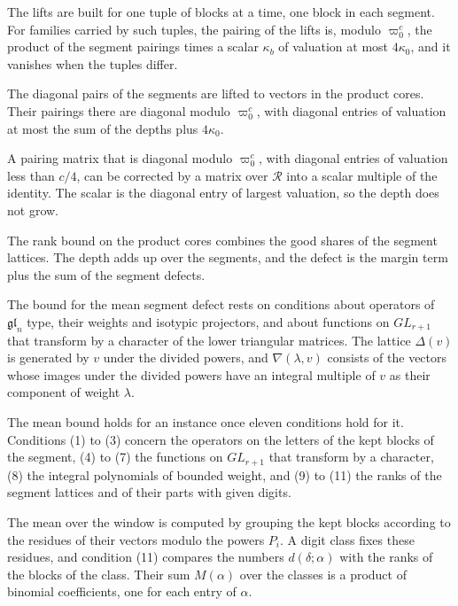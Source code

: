 The lifts are built for one tuple of blocks at a time, one block in each segment. For families carried
by such tuples, the pairing of the lifts is, modulo $\varpi_0^c$, the product of the segment pairings
times a scalar $\kappa_b$ of valuation at most $4\kappa_0$, and it vanishes when the tuples differ.

The diagonal pairs of the segments are lifted to vectors in the product cores. Their pairings there
are diagonal modulo $\varpi_0^c$, with diagonal entries of valuation at most the sum of the depths plus
$4\kappa_0$.

A pairing matrix that is diagonal modulo $\varpi_0^c$, with diagonal entries of valuation less than
$c/4$, can be corrected by a matrix over $\mathcal R$ into a scalar multiple of the identity. The scalar
is the diagonal entry of largest valuation, so the depth does not grow.

The rank bound on the product cores combines the good shares of the segment lattices. The depth adds
up over the segments, and the defect is the margin term plus the sum of the segment defects.

The bound for the mean segment defect rests on conditions about operators of $\mathfrak{gl}_n$ type,
their weights and isotypic projectors, and about functions on $GL_{r+1}$ that transform by a character
of the lower triangular matrices. The lattice $\Delta(v)$ is generated by $v$ under the divided powers,
and $\nabla(\lambda,v)$ consists of the vectors whose images under the divided powers have an integral
multiple of $v$ as their component of weight $\lambda$.

The mean bound holds for an instance once eleven conditions hold for it. Conditions (1) to (3) concern
the operators on the letters of the kept blocks of the segment, (4) to (7) the functions on $GL_{r+1}$
that transform by a character, (8) the integral polynomials of bounded weight, and (9) to (11) the
ranks of the segment lattices and of their parts with given digits.

The mean over the window is computed by grouping the kept blocks according to the residues of their
vectors modulo the powers $P_i$. A digit class fixes these residues, and condition (11) compares the
numbers $d(\delta;\alpha)$ with the ranks of the blocks of the class. Their sum $M(\alpha)$ over the classes
is a product of binomial coefficients, one for each entry of $\alpha$.

